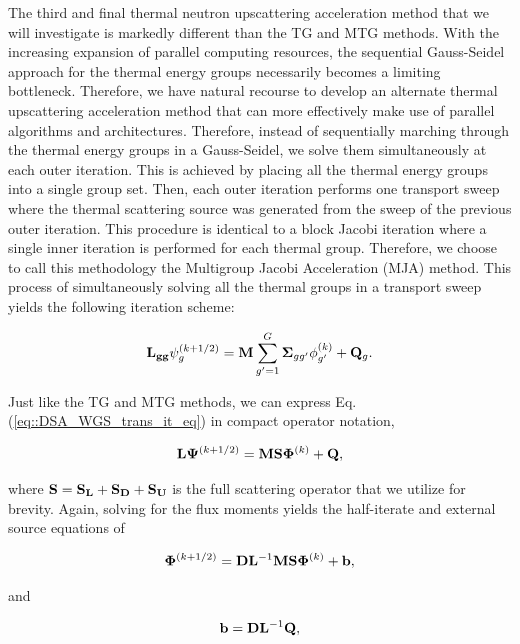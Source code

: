 The third and final thermal neutron upscattering acceleration method that we will investigate is markedly different than the TG and MTG methods. With the increasing expansion of parallel computing resources, the sequential Gauss-Seidel approach for the thermal energy groups necessarily becomes a limiting bottleneck. Therefore, we have natural recourse to develop an alternate thermal upscattering acceleration method that can more effectively make use of parallel algorithms and architectures. Therefore, instead of sequentially marching through the thermal energy groups in a Gauss-Seidel, we solve them simultaneously at each outer iteration. This is achieved by placing all the thermal energy groups into a single group set. Then, each outer iteration performs one transport sweep where the thermal scattering source was generated from the sweep of the previous outer iteration. This procedure is identical to a block Jacobi iteration where a single inner iteration is performed for each thermal group. Therefore, we choose to call this methodology the Multigroup Jacobi Acceleration (MJA) method. This process of simultaneously solving all the thermal groups in a transport sweep yields the following iteration scheme:

\begin{equation}
\label{eq::DSA_WGS_trans_it_eq}
{\bf L_{gg}} \psi_g^{(k+1/2)} =  {\bf M} \sum_{g'=1}^G {\bf \Sigma}_{g g'} \phi_{g'}^{(k)} + {\bf Q}_g .
\end{equation}

\noindent Just like the TG and MTG methods, we can express Eq. (\ref{eq::DSA_WGS_trans_it_eq}) in compact operator notation,

\begin{equation}
\label{eq::DSA_WGS_trans_it_eq_ops}
{\bf L} {\bf \Psi}^{(k+1/2)} = {\bf M} {\bf S}  {\bf \Phi}^{(k)} + {\bf Q} ,
\end{equation}

\noindent where ${\bf S} = {\bf S_{L}} + {\bf S_{D}} + {\bf S_{U}}$ is the full scattering operator that we utilize for brevity. Again, solving for the flux moments yields the half-iterate and external source equations of

\begin{equation}
\label{eq::DSA_MGJac_half_it_sol}
{\bf \Phi}^{(k+1/2)} = {\bf D}{\bf L}^{-1}  {\bf M} {\bf S} {\bf \Phi}^{(k)} + {\bf b} ,
\end{equation}

\noindent and

\begin{equation}
\label{eq::DSA_MGJac_half_it_forcingfunc}
{\bf b} = {\bf D}{\bf L}^{-1}  {\bf Q} ,
\end{equation}

